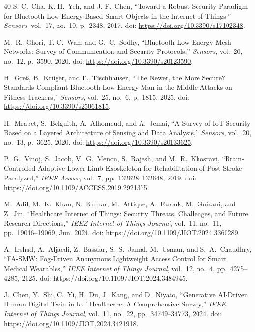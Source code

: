 \documentclass[journal]{IEEEtran}
\begin{document}
\begin{thebibliography}{40}
S.-C.~Cha, K.-H.~Yeh, and J.-F.~Chen, ``Toward a Robust Security Paradigm for Bluetooth Low Energy-Based Smart Objects in the Internet-of-Things,'' \emph{Sensors}, vol.~17, no.~10, p.~2348, 2017. doi: \url{https://doi.org/10.3390/s17102348}.

M.~R.~Ghori, T.-C.~Wan, and G.~C.~Sodhy, ``Bluetooth Low Energy Mesh Networks: Survey of Communication and Security Protocols,'' \emph{Sensors}, vol.~20, no.~12, p.~3590, 2020. doi: \url{https://doi.org/10.3390/s20123590}.

H.~Gre{\ss}, B.~Kr\"{u}ger, and E.~Tischhauser, ``The Newer, the More Secure? Standards-Compliant Bluetooth Low Energy Man-in-the-Middle Attacks on Fitness Trackers,'' \emph{Sensors}, vol.~25, no.~6, p.~1815, 2025. doi: \url{https://doi.org/10.3390/s25061815}.

H.~Mrabet, S.~Belguith, A.~Alhomoud, and A.~Jemai, ``A Survey of IoT Security Based on a Layered Architecture of Sensing and Data Analysis,'' \emph{Sensors}, vol.~20, no.~13, p.~3625, 2020. doi: \url{https://doi.org/10.3390/s20133625}.

P.~G.~Vinoj, S.~Jacob, V.~G.~Menon, S.~Rajesh, and M.~R.~Khosravi, ``Brain-Controlled Adaptive Lower Limb Exoskeleton for Rehabilitation of Post-Stroke Paralyzed,'' \emph{IEEE Access}, vol.~7, pp.~132628--132648, 2019. doi: \url{https://doi.org/10.1109/ACCESS.2019.2921375}.

M.~Adil, M.~K.~Khan, N.~Kumar, M.~Attique, A.~Farouk, M.~Guizani, and Z.~Jin, ``Healthcare Internet of Things: Security Threats, Challenges, and Future Research Directions,'' \emph{IEEE Internet of Things Journal}, vol.~11, no.~11, pp.~19046--19069, Jun. 2024. doi: \url{https://doi.org/10.1109/JIOT.2024.3360289}.

A.~Irshad, A.~Aljaedi, Z.~Bassfar, S.~S.~Jamal, M.~Usman, and S.~A.~Chaudhry, ``FA-SMW: Fog-Driven Anonymous Lightweight Access Control for Smart Medical Wearables,'' \emph{IEEE Internet of Things Journal}, vol.~12, no.~4, pp.~4275--4285, 2025. doi: \url{https://doi.org/10.1109/JIOT.2024.3484945}.

J.~Chen, Y.~Shi, C.~Yi, H.~Du, J.~Kang, and D.~Niyato, ``Generative AI-Driven Human Digital Twin in IoT Healthcare: A Comprehensive Survey,'' \emph{IEEE Internet of Things Journal}, vol.~11, no.~22, pp.~34749--34773, 2024. doi: \url{https://doi.org/10.1109/JIOT.2024.3421918}.


\end{thebibliography}
\end{document}
